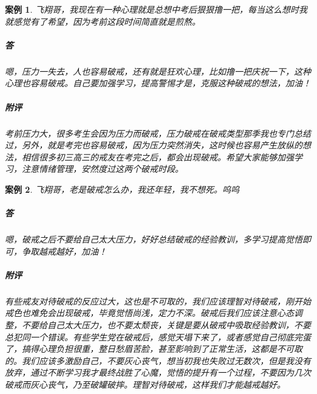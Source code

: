 \documentclass{ctexart}
\newtheorem{case}{案例}
\begin{document}
\begin{case}
    飞翔哥，我现在有一种心理就是总想中考后狠狠撸一把，每当这么想时我就感觉有了希望，因为考前这段时间简直就是煎熬。
    \subparagraph{答} 嗯，压力一失去，人也容易破戒，还有就是狂欢心理，比如撸一把庆祝一下，这种心理也容易破戒。自己要加强学习，提高警惕才是，克服这种破戒的想法，加油！
    \subparagraph{附评} 考前压力大，很多考生会因为压力而破戒，压力破戒在破戒类型那季我也专门总结过，另外，就是考完也容易破戒，因为压力突然消失，这时候也容易产生放纵的想法，相信很多初三高三的戒友在考完之后，都会出现破戒。希望大家能够加强学习，注意情绪管理，安然度过这两个破戒时段。
\end{case}

\begin{case}
    飞翔哥，老是破戒怎么办，我还年轻，我不想死。呜呜
    \subparagraph{答} 嗯，破戒之后不要给自己太大压力，好好总结破戒的经验教训，多学习提高觉悟即可，争取越戒越好，加油！
    \subparagraph{附评} 有些戒友对待破戒的反应过大，这也是不可取的，我们应该理智对待破戒，刚开始戒色也难免会出现破戒，毕竟觉悟尚浅，定力不深。破戒后我们应该注意心态调整，不要给自己太大压力，也不要太颓丧，关键是要从破戒中吸取经验教训，不要总犯同一个错误。有些学生党在破戒后，感觉天塌下来了，或者感觉自己彻底完蛋了，搞得心理负担很重，整日愁眉苦脸，甚至影响到了正常生活，这都是不可取的。我们应该多激励自己，不要灰心丧气，想当初我也失败过无数次，但是我没有放弃，通过不断学习我才最终战胜了心魔，觉悟的提升有一个过程，不要因为几次破戒而灰心丧气，乃至破罐破摔。理智对待破戒，这样我们才能越戒越好。
\end{case}
\end{document}

